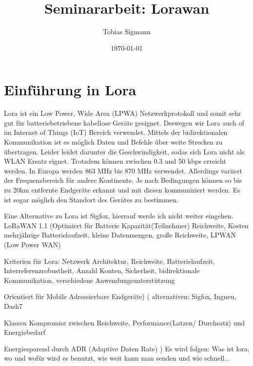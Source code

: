 \documentclass[a4paper,12pt]{article}
\author{Tobias Sigmann}
\title{Seminararbeit: Lorawan}
\date{\today}
\begin{document}
    \maketitle
    \newpage
    \tableofcontents
    \newpage
    \begin{abstract} 
       \cite{WhatIsLoRa}
       \newline
       \cite{Semtech}
    \end{abstract}

    \section{Einführung in Lora}
        Lora ist ein Low Power, Wide Area (LPWA) Netzwerkprotokoll und somit sehr gut für batteriebetriebene kabellose Geräte geeignet. Deswegen wir Lora auch of im Internet of Things (IoT) Bereich verwendet.
        Mittels der bidirektionalen Kommunikation ist es möglich Daten und Befehle über weite Strecken zu übertragen. Leider leidet darunter die Geschwindigkeit, sodas sich Lora nicht als WLAN Ersatz eignet.
        Trotzdem können zwischen 0.3 und 50 kbps erreicht werden. In Europa werden 863 MHz bis 870 MHz verwendet. Allerdings variiert der Frequenzbereich für andere Kontinente. Je nach Bedingungen können so bis zu 20km entfernte Endgeräte erkannt und mit diesen kommuniziert werden.
        Es ist sogar möglich den Standort des Gerätes zu bestimmen.
        
        Eine Alternative zu Lora ist Sigfox, hierrauf werde ich nicht weiter eingehen.
        LoRaWAN 1.1
        \newline    
        \cite{WhatIsLoRa}(Optimiert für Batterie Kapazität(Teilnehmer) Reichweite, Kosten
        mehrjährige Batterielaufzeit, kleine Datenmengen, große Reichweite, LPWAN (Low Power WAN)
        
        Kriterien für Lora: Netzwerk Architektur, Reichweite, Batterielaufzeit, Interreferenzrobustheit, Anzahl Konten, Sicherheit, bidirektionale Kommunikation, verschiedene Anwendungsunterstützung
        
        Orientiert für Mobile Adressierbare Endgeräte)
        \newline{}
            \cite{LoraLimit}(
                alternativen: Sigfox, Ingneu, Dash7

                Klassen Kompromiss zwischen Reichweite, Performance(Latzen/ Durchsatz) und Energiebedarf

                Energiesparend durch ADR (Adaptive Daten Rate)
            )
        \newline{}\newline{} Es wird folgen: Was ist lora, wo und wofür wird es benutzt, wie weit kann man senden und wie schnell...
\end{document}
